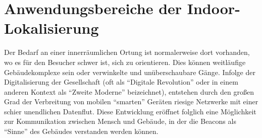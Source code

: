 \section{Anwendungsbereiche der Indoor-Lokalisierung}
Der Bedarf an einer innerräumlichen Ortung ist normalerweise dort vorhanden, wo es für den Besucher schwer ist, sich zu orientieren. Dies können weitläufige Gebäudekomplexe sein oder verwinkelte und unüberschaubare Gänge. Infolge der Digitalisierung der Gesellschaft (oft als "`Digitale Revolution"' oder in einem anderen Kontext als "`Zweite Moderne"' \cite{DigRev} beizeichnet), entstehen durch den großen Grad der Verbreitung von mobilen "`smarten"' Geräten riesige Netzwerke mit einer schier unendlichen Datenflut. Diese Entwicklung eröffnet folglich eine Möglichkeit zur Kommunikation zwischen Mensch und Gebäude, in der die Beacons als "`Sinne"' des Gebäudes verstanden werden können.  
